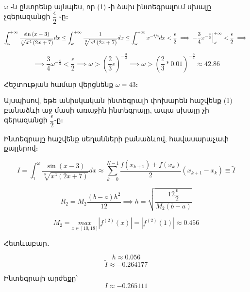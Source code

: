 \documentclass{article}
\begin{document}
$\omega$ ֊ն ընտրենք այնպես, որ (1) ֊ի ձախ ինտեգրալում սխալը չգերազանցի $\dfrac{\epsilon}{2}$ ֊ը։

		$$\int_{\omega}^{+\infty}\dfrac{\sin\left(x - 3\right)}{\sqrt[3]{x^{4}\left(2x+7\right)}}dx  \leq \int_{\omega}^{+\infty}\dfrac{1}{\sqrt[3]{x^{4}\left(2x+7\right)}}dx \leq
		\int_{\omega}^{+\infty} x ^ {-\sfrac{4}{3}} dx < \dfrac{\epsilon}{2} \implies -\frac{3}{4} x ^ {-\frac{7}{3}} \Big |_{\omega}^{+\infty}  < \dfrac{\epsilon}{2} \implies$$

		$$ \implies \frac{3}{4}\omega^{-\frac{4}{3}} < \frac{\epsilon}{2} \implies \omega > \left(\dfrac{2}{3}\epsilon \right)^{-\frac{3}{4   }} \implies \omega > \left(\dfrac{2}{3} * 0.01\right)^{-\frac{3}{4}} \approx 42.86$$

Հեշտության համար վերցնենք $\omega = 43$։

Այսպիսով, եթե անիսկական ինտեգրալի փոխարեն հաշվենք (1) բանաձևի աջ մասի առաջին ինտեգրալը, ապա սխալը չի գերազանցի $\dfrac{\epsilon}{2}$֊ը։

Ինտեգրալը հաշվենք սեղանների բանաձևով, հավասարաչափ քայլերով։

							$$I = \int_{1}^{\omega}\dfrac{\sin\left(x - 3\right)}{\sqrt[3]{x^{4}\left(2x+7\right)}}dx \approx  \sum_{k = 0}^{N - 1} \dfrac{f\left(x_{k+1}\right) + f\left(x_{k}\right)}{2}\left(x_{k + 1} - x_{k}\right) \equiv \tilde{I}$$

							$$R_2 = M_{2} \dfrac{\left(b - a\right)h^{2}}{12} \implies h = \sqrt{\dfrac{12 \dfrac{\epsilon}{2}}{M_{2}\left(b - a\right)}}$$
					
								$$M_{2} = \underset{x \in \left[10, 18\right]}{max}\left|f^{\left(2\right)}\left(x\right)\right| = \left|f^{\left(2\right)}\left(1\right)\right| \approx 0.456$$

Հետևաբար․
					
							$$h \approx 0.056$$
							$$\tilde{I} \approx -0.264177$$

Ինտեգրալի արժեքը՝  $$ I \approx -0.265111$$
\end{document}

